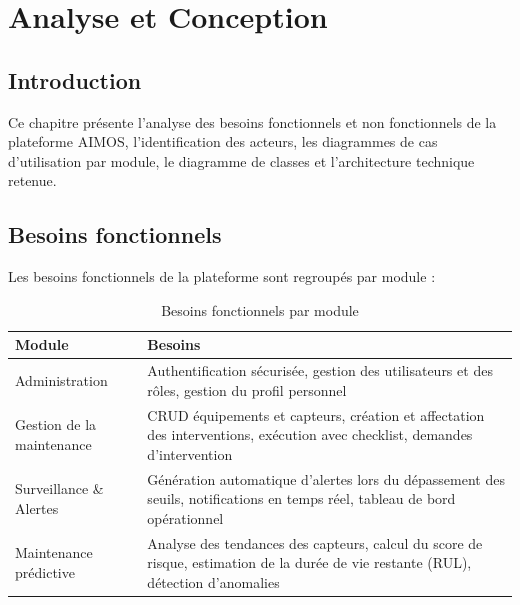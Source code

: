 \chapter{Analyse et Conception}

\section{Introduction}
Ce chapitre présente l'analyse des besoins fonctionnels et non fonctionnels de la plateforme AIMOS, l'identification des acteurs, les diagrammes de cas d'utilisation par module, le diagramme de classes et l'architecture technique retenue.

\section{Besoins fonctionnels}
Les besoins fonctionnels de la plateforme sont regroupés par module :

\begin{table}[H]
\centering
\renewcommand{\arraystretch}{1.4}
\begin{tabular}{@{}p{}p{}@{}}
\hline
\textbf{Module} & \textbf{Besoins} \\
\hline
Administration & Authentification sécurisée, gestion des utilisateurs et des rôles, gestion du profil personnel \\
\hline
Gestion de la maintenance & CRUD équipements et capteurs, création et affectation des interventions, exécution avec checklist, demandes d'intervention \\
\hline
Surveillance \& Alertes & Génération automatique d'alertes lors du dépassement des seuils, notifications en temps réel, tableau de bord opérationnel \\
\hline
Maintenance prédictive & Analyse des tendances des capteurs, calcul du score de risque, estimation de la durée de vie restante (RUL), détection d'anomalies \\
\hline
\end{tabular}
\caption{Besoins fonctionnels par module}
\end{table}

